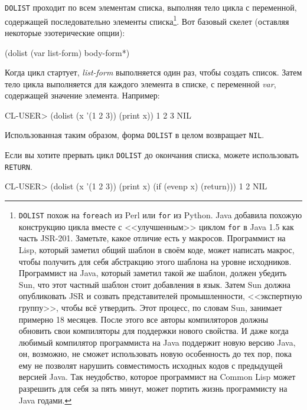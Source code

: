 \lstinline{DOLIST} проходит по всем элементам списка, выполняя тело цикла с переменной,
содержащей последовательно элементы списка\footnote{\lstinline{DOLIST} похож на
  \lstinline{foreach} из Perl или \lstinline{for} из Python. Java добавила похожую
  конструкцию цикла вместе с <<улучшенным>> циклом \lstinline{for} в Java 1.5 как часть
  JSR-201. Заметьте, какое отличие есть у макросов. Программист на Lisp, который заметил
  общий шаблон в своём коде, может написать макрос, чтобы получить для себя абстракцию
  этого шаблона на уровне исходников. Программист на Java, который заметил такой же
  шаблон, должен убедить Sun, что этот частный шаблон стоит добавления в язык. Затем Sun
  должна опубликовать JSR и созвать представителей промышленности, <<экспертную группу>>,
  чтобы всё утвердить. Этот процесс, по словам Sun, занимает примерно 18 месяцев. После
  этого все авторы компиляторов должны обновить свои компиляторы для поддержки нового
  свойства. И даже когда любимый компилятор программиста на Java поддержит новую версию
  Java, он, возможно, не сможет использовать новую особенность до тех пор, пока ему не
  позволят нарушить совместимость исходных кодов с предыдущей версией Java. Так
  неудобство, которое программист на Common Lisp может разрешить для себя за пять минут,
  может портить жизнь программисту на Java годами.}\hspace{\footnotenegspace}. Вот базовый скелет (оставляя
некоторые эзотерические опции):

\begin{myverb}
(dolist (var list-form)
  body-form*)
\end{myverb}

Когда цикл стартует, \textit{list-form} выполняется один раз, чтобы создать список. Затем
тело цикла выполняется для каждого элемента в списке, с переменной \textit{var},
содержащей значение элемента. Например:

\begin{myverb}
CL-USER> (dolist (x '(1 2 3)) (print x))
1
2
3
NIL
\end{myverb}

Использованная таким образом, форма \lstinline{DOLIST} в целом возвращает \lstinline{NIL}.

Если вы хотите прервать цикл \lstinline{DOLIST} до окончания списка, можете использовать
\lstinline{RETURN}.

\begin{myverb}
CL-USER> (dolist (x '(1 2 3)) (print x) (if (evenp x) (return)))
1
2
NIL
\end{myverb}

